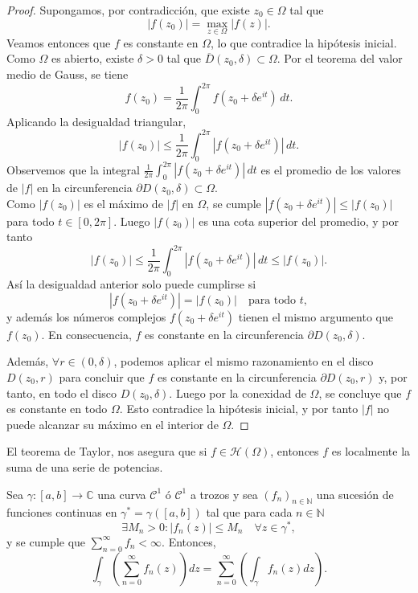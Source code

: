 \begin{proof}
    Supongamos, por contradicción, que existe $z_0 \in \Omega$ tal que
    \[
        |f(z_0)| = \max_{z \in \Omega} |f(z)|.
    \]
    Veamos entonces que $f$ es constante en $\Omega$, lo que contradice la hipótesis inicial.\\
    Como $\Omega$ es abierto, existe $\delta > 0$ tal que $\overline{D}(z_0, \delta) \subset \Omega$. 
    Por el teorema del valor medio de Gauss, se tiene
    \[
        f(z_0) = \frac{1}{2\pi} \int_{0}^{2\pi} f(z_0 + \delta e^{it}) \, dt.
    \]
    Aplicando la desigualdad triangular,
    \[
        |f(z_0)| \leq \frac{1}{2\pi} \int_{0}^{2\pi} |f(z_0 + \delta e^{it})| \, dt.
    \]
    Observemos que la integral $\frac{1}{2\pi} \int_{0}^{2\pi} |f(z_0 + \delta e^{it})| \, dt$ es el promedio de los valores de $|f|$ en la circunferencia $\partial D(z_0, \delta) \subset \Omega$.\\
    Como $|f(z_0)|$ es el máximo de $|f|$ en $\Omega$, se cumple $|f(z_0 + \delta e^{it})| \le |f(z_0)|$ para todo $t \in [0,2\pi]$. Luego $|f(z_0)|$ es una cota superior del promedio, y por tanto
    \[
        |f(z_0)| \leq \frac{1}{2\pi} \int_{0}^{2\pi} |f(z_0 + \delta e^{it})| \, dt \leq |f(z_0)|.
    \] 
    Así la desigualdad anterior solo puede cumplirse si
    \[
        |f(z_0 + \delta e^{it})| = |f(z_0)| \quad \text{para todo } t,
    \]
    y además los números complejos $f(z_0 + \delta e^{it})$ tienen el mismo argumento que $f(z_0)$. 
    En consecuencia, $f$ es constante en la circunferencia $\partial D(z_0, \delta)$.

    Además, $\forall r \in (0, \delta)$, podemos aplicar el mismo razonamiento en el disco $D(z_0, r)$ para concluir que $f$ es constante en la circunferencia $\partial D(z_0, r)$ y, por tanto, en todo el disco $D(z_0, \delta)$. Luego por la conexidad de $\Omega$, se concluye que $f$ es constante en todo $\Omega$. 
    Esto contradice la hipótesis inicial, y por tanto $|f|$ no puede alcanzar su máximo en el interior de $\Omega$.
\end{proof}



El teorema de Taylor, nos asegura que si $f \in \mathcal{H}(\Omega)$, entonces $f$ es localmente la suma de una serie de potencias.

\begin{proposición}
    Sea $\gamma : [a,b] \to \mathbb{C}$ una curva $\mathcal{C}^1$ ó $\mathcal{C}^1$ a trozos y sea $(f_n)_{n \in \mathbb{N}}$ una sucesión de funciones continuas en $\gamma ^* = \gamma([a,b])$ tal que para cada $n \in \mathbb{N}$ 
    \[
        \exists M_n > 0 : |f_n(z)| \leq M_n \quad \forall z \in \gamma^*,
    \]
    y se cumple que $\sum_{n=0}^{\infty} f_n < \infty$. Entonces, 
    \[
        \int_{\gamma} \left( \sum_{n=0}^{\infty} f_n(z) \right) dz = \sum_{n=0}^{\infty} \left( \int_{\gamma} f_n(z) dz \right).
    \]
\end{proposición}

